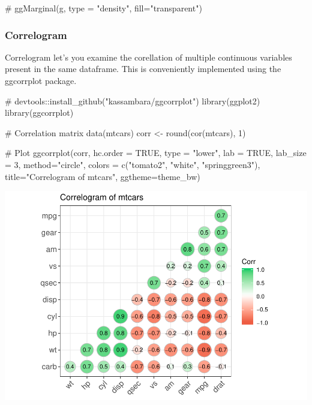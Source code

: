 \documentclass[a4paper]{article}
\newenvironment{Shaded}{}{}
\newcommand{\KeywordTok}[1]{\textcolor[rgb]{0.00,0.00,1.00}{#1}}
\newcommand{\DataTypeTok}[1]{#1}
\newcommand{\DecValTok}[1]{#1}
\newcommand{\StringTok}[1]{\textcolor[rgb]{0.00,0.50,0.50}{#1}}
\newcommand{\CommentTok}[1]{\textcolor[rgb]{0.00,0.50,0.00}{#1}}
\newcommand{\OtherTok}[1]{\textcolor[rgb]{1.00,0.25,0.00}{#1}}
\newcommand{\NormalTok}[1]{#1}
\begin{document}
\begin{Shaded}
\begin{Highlighting}[]
\CommentTok{# ggMarginal(g, type = "density", fill="transparent")}
\end{Highlighting}
\end{Shaded}

\newpage

\subsubsection{Correlogram}\label{correlogram}

Correlogram let's you examine the corellation of multiple continuous
variables present in the same dataframe. This is conveniently
implemented using the ggcorrplot package.

\begin{Shaded}
\begin{Highlighting}[]
\CommentTok{# devtools::install_github("kassambara/ggcorrplot")}
\KeywordTok{library}\NormalTok{(ggplot2)}
\KeywordTok{library}\NormalTok{(ggcorrplot)}

\CommentTok{# Correlation matrix}
\KeywordTok{data}\NormalTok{(mtcars)}
\NormalTok{corr <-}\StringTok{ }\KeywordTok{round}\NormalTok{(}\KeywordTok{cor}\NormalTok{(mtcars), }\DecValTok{1}\NormalTok{)}

\CommentTok{# Plot}
\KeywordTok{ggcorrplot}\NormalTok{(corr, }\DataTypeTok{hc.order =} \OtherTok{TRUE}\NormalTok{, }
           \DataTypeTok{type =} \StringTok{"lower"}\NormalTok{, }
           \DataTypeTok{lab =} \OtherTok{TRUE}\NormalTok{, }
           \DataTypeTok{lab_size =} \DecValTok{3}\NormalTok{, }
           \DataTypeTok{method=}\StringTok{"circle"}\NormalTok{, }
           \DataTypeTok{colors =} \KeywordTok{c}\NormalTok{(}\StringTok{"tomato2"}\NormalTok{, }\StringTok{"white"}\NormalTok{, }\StringTok{"springgreen3"}\NormalTok{), }
           \DataTypeTok{title=}\StringTok{"Correlogram of mtcars"}\NormalTok{, }
           \DataTypeTok{ggtheme=}\NormalTok{theme_bw)}
\end{Highlighting}
\end{Shaded}

\includegraphics{M24-ggplot2_Gallery_files/figure-latex/unnamed-chunk-11-1.pdf}
\newpage
\end{document}
